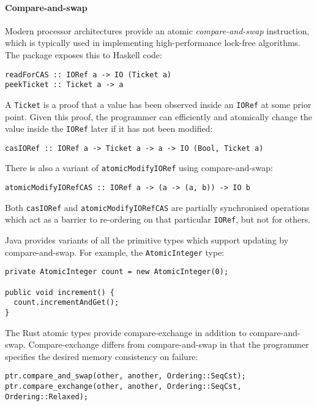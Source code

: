 \paragraph{Compare-and-swap}
Modern processor architectures provide an atomic \emph{compare-and-swap}
instruction, which is typically used in implementing high-performance lock-free
algorithms.  The  package exposes this to Haskell code:

\begin{verbatim}
readForCAS :: IORef a -> IO (Ticket a)
peekTicket :: Ticket a -> a
\end{verbatim}

A \verb|Ticket| is a proof that a value has been observed inside an
\verb|IORef| at some prior point.  Given this proof, the programmer
can efficiently and atomically change the value inside the
\verb|IORef| later if it has not been modified:

\begin{verbatim}
casIORef :: IORef a -> Ticket a -> a -> IO (Bool, Ticket a)
\end{verbatim}

There is also a variant of \verb|atomicModifyIORef| using compare-and-swap:

\begin{verbatim}
atomicModifyIORefCAS :: IORef a -> (a -> (a, b)) -> IO b
\end{verbatim}

Both \verb|casIORef| and \verb|atomicModifyIORefCAS| are partially
synchronised operations which act as a barrier to re-ordering on that
particular \verb|IORef|, but not for others.

Java provides variants of all the primitive types which support
updating by compare-and-swap.  For example, the \verb|AtomicInteger|
type:

\begin{verbatim}
private AtomicInteger count = new AtomicInteger(0);

public void increment() {
  count.incrementAndGet();
}
\end{verbatim}

The Rust atomic types provide compare-exchange in addition to
compare-and-swap.  Compare-exchange differs from compare-and-swap in
that the programmer specifies the desired memory consistency on
failure:

\begin{verbatim}
ptr.compare_and_swap(other, another, Ordering::SeqCst);
ptr.compare_exchange(other, another, Ordering::SeqCst, Ordering::Relaxed);
\end{verbatim}

